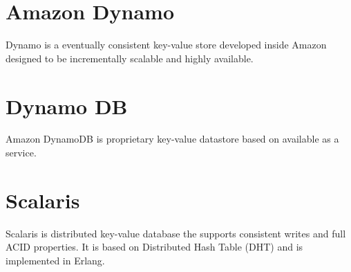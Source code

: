 
\section{Amazon Dynamo}

Dynamo \citep{DeCandia07} is a eventually consistent key-value store developed 
inside Amazon designed to be incrementally scalable and highly available.


\section{Dynamo DB}

Amazon DynamoDB \citep{dynamoDB} is proprietary key-value datastore based on
\citet{DeCandia07} available as a service.


\section{Scalaris}

Scalaris \citep{scalaris} is distributed key-value database the supports
consistent writes and full ACID properties. It is based on Distributed Hash
Table (DHT)%
and is implemented in Erlang.



